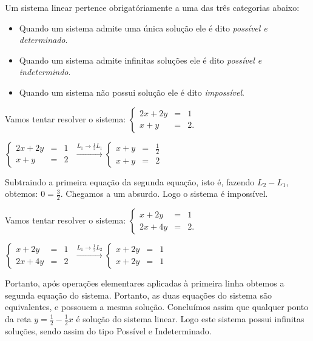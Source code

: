  Um sistema linear pertence obrigatóriamente a uma das três categorias abaixo:
\begin{mybox} \begin{itemize}
\item Quando um sistema admite uma única solução ele é dito {\it possível e determinado}.
\item Quando um sistema admite infinitas soluções ele é dito {\it possível e indetermindo}.
\item Quando um sistema não possui solução ele é dito {\it impossível}.
\end{itemize}
\end{mybox}

\vspace{0.5cm}

\begin{ex} Vamos tentar resolver o sistema: $\left\{ \begin{array}{rcl}
2x+2y&=&1\\
x+y&=&2.
\end{array}\right.$

\noindent$\left\{ \begin{array}{rcl}
2x+2y&=&1\\
x+y&=&2
\end{array}\right.$ $\xrightarrow[]{L_1\rightarrow \frac{1}{2}L_1}\left\{ \begin{array}{rcl}
x+y&=&\frac{1}{2}\\
x+y&=&2
\end{array}\right.$

\vspace{0.2cm}

Subtraindo a primeira equação da segunda equação, isto é, fazendo $L_2-L_1$, obtemos: $0=\frac{3}{2}$.
Chegamos a um absurdo. Logo o sistema é impossível.
\end{ex}


\begin{ex} Vamos tentar resolver o sistema: $\left\{ \begin{array}{rcl}
x+2y&=&1\\
2x+4y&=&2.
\end{array}\right.$

\noindent$\left\{ \begin{array}{rcl}
x+2y&=&1\\
2x+4y&=&2
\end{array}\right.$ $\xrightarrow[]{L_1\rightarrow \frac{1}{2}L_2}\left\{ \begin{array}{rcl}
x+2y&=&1\\
x+2y&=&1
\end{array}\right.$

\vspace{0.2cm}

Portanto, após operações elementares aplicadas à primeira linha obtemos a segunda equação do sistema. Portanto, as duas
equações do sistema são equivalentes, e possouem a mesma solução. Concluímos assim que qualquer ponto da reta $y=\frac{1}{2}-\frac{1}{2}x$
é solução do sistema linear. Logo este sistema possui infinitas soluções, sendo assim do tipo Possível e Indeterminado.
\end{ex}

